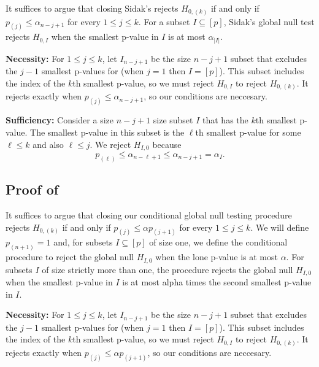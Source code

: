 \documentclass{article}
\begin{document}
\begin{appendix}
It suffices to argue that closing Sidak's rejects $H_{0, (k)}$ if and only if $p_{(j)} \leq \alpha_{n - j + 1}$ for every $1 \leq j \leq k$. For a subset $I \subseteq [p]$, Sidak's global null test rejects $H_{0, I}$ when the smallest p-value in $I$ is at most $\alpha_{|I|}$. \newline 

\noindent \textbf{Necessity: } For $1 \leq j \leq k$, let $I_{n-j + 1}$ be the size $n - j + 1$ subset that excludes the $j - 1$ smallest p-values for (when $j = 1$ then $I = [p]$). This subset includes the index of the $k$th smallest p-value, so we must reject $H_{0, I}$ to reject $H_{0, (k)}$. It rejects exactly when $p_{(j)} \leq \alpha_{n - j + 1}$, so our conditions are neccesary.\newline 

\noindent \textbf{Sufficiency: } Consider a size $n - j  + 1$ size subset $I$ that has the $k$th smallest p-value. The smallest p-value in this subset is the $\ell$th smallest p-value for some $\ell \leq k$ and also $\ell \leq j$. We reject $H_{I, 0}$ because 
\begin{equation*}
    p_{(\ell)} \leq \alpha_{n - \ell + 1} \leq \alpha_{n - j + 1} = \alpha_{I}.
\end{equation*}

\subsection{Proof of }

It suffices to argue that closing our conditional global null testing procedure rejects $H_{0, (k)}$ if and only if $p_{(j)} \leq \alpha p_{(j + 1)} $ for every $1 \leq j \leq k$. We will define $p_{(n+1)} = 1$ and, for subsets $I \subseteq [p]$ of size one, we define the conditional procedure to reject the global null $H_{I, 0}$ when the lone p-value is at most $\alpha$. For subsets $I$ of size strictly more than one, the procedure rejects the global null $H_{I, 0}$ when the smallest p-value in $I$ is at most alpha times the second smallest p-value in $I$. \newline 

\noindent \textbf{Necessity: } For $1 \leq j \leq k$, let $I_{n-j + 1}$ be the size $n - j + 1$ subset that excludes the $j - 1$ smallest p-values for (when $j = 1$ then $I = [p]$). This subset includes the index of the $k$th smallest p-value, so we must reject $H_{0, I}$ to reject $H_{0, (k)}$. It rejects exactly when $p_{(j)} \leq \alpha p_{(j + 1)}$, so our conditions are neccesary. \newline 


\end{appendix}
\end{document}

